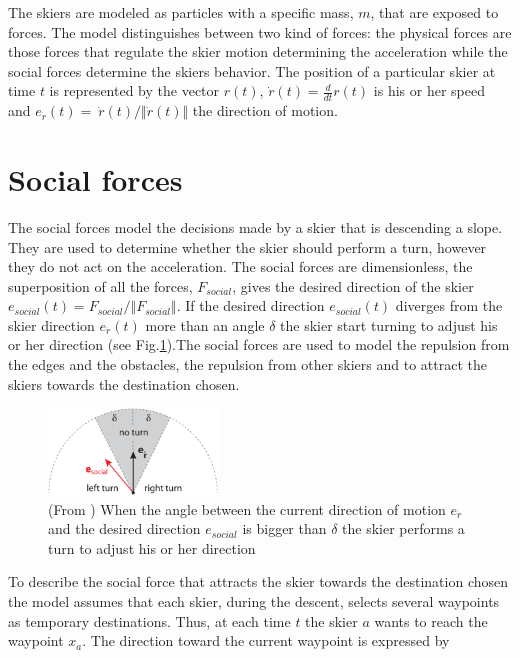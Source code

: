 \documentclass[12pt,a4paper,twoside]{book}
\begin{document}
The skiers are modeled as particles with a specific mass, $m$, that are exposed to forces. The model distinguishes between two kind of forces: the physical forces are those forces that regulate the skier motion determining the acceleration while the social forces determine the skiers behavior. The position of a particular skier at time $t$ is represented by the vector $r(t)$, $\dot{r}(t)=\frac{d}{dt}r(t)$ is his or her speed and $e_{\dot{r}}(t)=\ \dot{r}(t) / \Vert \dot{r}(t)\Vert$ the direction of motion.

\section{Social forces}
The social forces model the decisions made by a skier that is descending a slope. They are used to determine whether the skier should perform a turn, however they do not act on the acceleration. The social forces are dimensionless, the superposition of all the forces, $F_{social}$, gives the desired direction of the skier $e_{social}(t)=F_{social} / \Vert F_{social} \Vert$. If the desired direction $e_{social}(t)$ diverges from the skier direction $e_{\dot{r}}(t)$ more than an angle ${\delta}$ the skier start turning to adjust his or her direction (see Fig.\ref{start_turn_pic}).The social forces are used to model the repulsion from the edges and the obstacles, the repulsion from other skiers and to attract the skiers towards the destination chosen.

\begin{figure}[!ht]
  \begin{center}
    \includegraphics[width=0.4\textwidth]{images/start_turn_pic.eps}
    \caption{(From \cite{hol2012}) When the angle between the current direction of motion $e_{\dot{r}}$ and the desired direction $e_{social}$ is bigger than $\delta$ the skier performs a turn to adjust his or her direction}\label{start_turn_pic}
  \end{center}
\end{figure}

To describe the social force that attracts the skier towards the destination chosen the model assumes that each skier, during the descent, selects several waypoints as temporary destinations. Thus, at each time $t$ the skier $a$ wants to reach the waypoint $x_a$. The direction toward the current waypoint is expressed by
\end{document}
